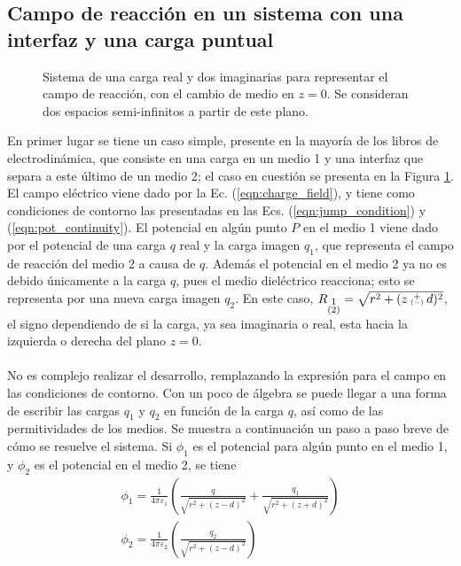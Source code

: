 \documentclass[12pt, oneside, numbers, spanish]{ezthesis}
\numberwithin{equation}{section}
\newcommand\varpm{\mathbin{\vcenter{\hbox{\oalign{\hfil$\scriptstyle+$\hfil\cr\noalign{\kern-.3ex}$\scriptscriptstyle({-})$\cr}}}}}
\begin{document}
\subsection{Campo de reacción en un sistema con una interfaz y una carga puntual}\label{subsec:Reaction_Field}
\begin{figure}[H]
	\centering
	
	\caption{Sistema de una carga real y dos imaginarias para representar el campo de reacción, con el cambio de medio en $z=0$. Se consideran dos espacios semi-infinitos a partir de este plano.}\label{Fig:Fig_3}
\end{figure}
En primer lugar se tiene un caso simple, presente en la mayoría de los libros de electrodinámica, que consiste en una carga en un medio 1 y una interfaz que separa a este último de un medio 2; el caso en cuestión se presenta en la Figura \ref{Fig:Fig_3}. El campo eléctrico viene dado por la Ec. (\ref{eqn:charge_field}), y tiene como condiciones de contorno las presentadas en las Ecs. (\ref{eqn:jump_condition}) y (\ref{eqn:pot_continuity}).
El potencial en algún punto $P$ en el medio 1 viene dado por el potencial de una carga $q$ real y la carga imagen $q_1$, que representa el campo de reacción del medio 2 a causa de $q$. Además el potencial en el medio 2 ya no es debido únicamente a la carga $q$, pues el medio dieléctrico reacciona; esto se representa por una nueva carga imagen $q_2$. En este caso, $R_{\substack{1\\(2)}} = \sqrt{r^2 + (z \varpm d)^2}$, el signo dependiendo de si la carga, ya sea imaginaria o real, esta hacia la izquierda o derecha del plano $z=0$.\\\\
No es complejo realizar el desarrollo, remplazando la expresión para el campo en las condiciones de contorno. Con un poco de álgebra se puede llegar a una forma de escribir las cargas $q_1$ y $q_2$ en función de la carga $q$, así como de las permitividades de los medios. Se muestra a continuación un paso a paso breve de cómo se resuelve el sistema. Si $\phi_1$ es el potencial para algún punto en el medio 1, y $\phi_2$ es el potencial en el medio 2, se tiene
\begin{gather}
\phi_1 = \frac{1}{4\pi\varepsilon_1}\left(\frac{q}{\sqrt{r^2+(z-d)^2}}+\frac{q_1}{\sqrt{r^2+(z+d)^2}}\right)\label{eqn:potential_system_image_method_1}\\
\phi_2 = \frac{1}{4\pi\varepsilon_2}\left(\frac{q_2}{\sqrt{r^2+(z-d)^2}}\right)\label{eqn:potential_system_image_method_2}
\end{gather}
\end{document}
